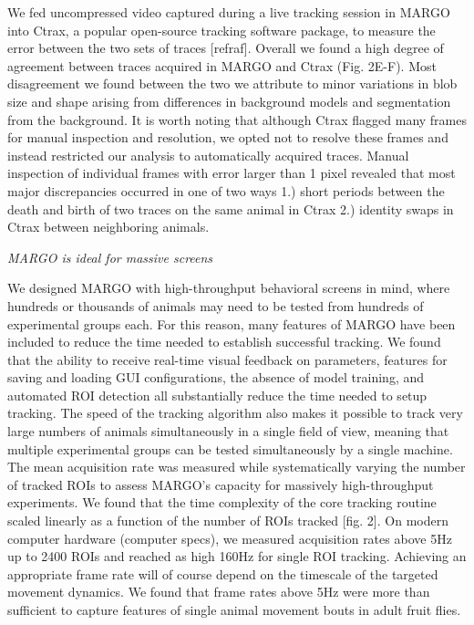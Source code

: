\documentclass[10pt]{article}
\begin{document}
\begin{multicols}{2}
We fed uncompressed video captured during a live tracking session in MARGO into Ctrax, a popular open-source tracking software package, to measure the error between the two sets of traces [refraf]. Overall we found a high degree of agreement between traces acquired in MARGO and Ctrax (Fig. 2E-F). Most disagreement we found between the two we attribute to minor variations in blob size and shape arising from differences in background models and segmentation from the background. It is worth noting that although Ctrax flagged many frames for manual inspection and resolution, we opted not to resolve these frames and instead restricted our analysis to automatically acquired traces. Manual inspection of individual frames with error larger than 1 pixel revealed that most major discrepancies occurred in one of two ways 1.) short periods between the death and birth of two traces on the same animal in Ctrax 2.) identity swaps in Ctrax between neighboring animals.

\textit{MARGO is ideal for massive screens}

We designed MARGO with high-throughput behavioral screens in mind, where hundreds or thousands of animals may need to be tested from hundreds of experimental groups each. For this reason, many features of MARGO have been included to reduce the time needed to establish successful tracking. We found that the ability to receive real-time visual feedback on parameters, features for saving and loading GUI configurations, the absence of model training, and automated ROI detection all  substantially reduce the time needed to setup tracking. The speed of the tracking algorithm also makes it possible to track very large numbers of animals simultaneously in a single field of view, meaning that multiple experimental groups can be tested simultaneously by a single machine. The mean acquisition rate was measured while systematically varying the number of tracked ROIs to assess MARGO’s capacity for massively high-throughput experiments. We found that the time complexity of the core tracking routine scaled linearly as a function of the number of ROIs tracked [fig. 2]. On modern computer hardware (computer specs), we measured acquisition rates above 5Hz up to 2400 ROIs and reached as high 160Hz for single ROI tracking. Achieving an appropriate frame rate will of course depend on the timescale of the targeted movement dynamics. We found that frame rates above 5Hz were more than sufficient to capture features of single animal movement bouts in adult fruit flies.


\end{multicols}
\end{document}
